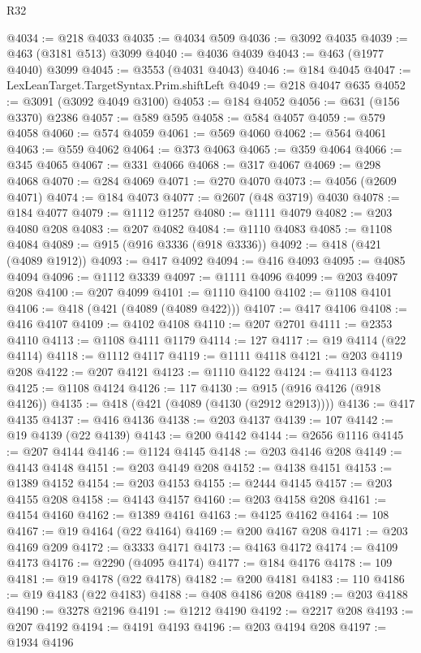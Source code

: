 \begin{lexlean}{R32}
\begin{coremodule}
@4034 := @218 @4033
@4035 := @4034 @509
@4036 := @3092 @4035
@4039 := @463 (@3181 @513) @3099
@4040 := @4036 @4039
@4043 := @463 (@1977 @4040) @3099
@4045 := @3553 (@4031 @4043)
@4046 := @184 @4045
@4047 := LexLeanTarget.TargetSyntax.Prim.shiftLeft
@4049 := @218 @4047 @635
@4052 := @3091 (@3092 @4049 @3100)
@4053 := @184 @4052
@4056 := @631 (@156 @3370) @2386
@4057 := @589 @595
@4058 := @584 @4057
@4059 := @579 @4058
@4060 := @574 @4059
@4061 := @569 @4060
@4062 := @564 @4061
@4063 := @559 @4062
@4064 := @373 @4063
@4065 := @359 @4064
@4066 := @345 @4065
@4067 := @331 @4066
@4068 := @317 @4067
@4069 := @298 @4068
@4070 := @284 @4069
@4071 := @270 @4070
@4073 := @4056 (@2609 @4071)
@4074 := @184 @4073
@4077 := @2607 (@48 @3719) @4030
@4078 := @184 @4077
@4079 := @1112 @1257
@4080 := @1111 @4079
@4082 := @203 @4080 @208
@4083 := @207 @4082
@4084 := @1110 @4083
@4085 := @1108 @4084
@4089 := @915 (@916 @3336 (@918 @3336))
@4092 := @418 (@421 (@4089 @1912))
@4093 := @417 @4092
@4094 := @416 @4093
@4095 := @4085 @4094
@4096 := @1112 @3339
@4097 := @1111 @4096
@4099 := @203 @4097 @208
@4100 := @207 @4099
@4101 := @1110 @4100
@4102 := @1108 @4101
@4106 := @418 (@421 (@4089 (@4089 @422)))
@4107 := @417 @4106
@4108 := @416 @4107
@4109 := @4102 @4108
@4110 := @207 @2701
@4111 := @2353 @4110
@4113 := @1108 @4111 @1179
@4114 := 127
@4117 := @19 @4114 (@22 @4114)
@4118 := @1112 @4117
@4119 := @1111 @4118
@4121 := @203 @4119 @208
@4122 := @207 @4121
@4123 := @1110 @4122
@4124 := @4113 @4123
@4125 := @1108 @4124
@4126 := 117
@4130 := @915 (@916 @4126 (@918 @4126))
@4135 := @418 (@421 (@4089 (@4130 (@2912 @2913))))
@4136 := @417 @4135
@4137 := @416 @4136
@4138 := @203 @4137
@4139 := 107
@4142 := @19 @4139 (@22 @4139)
@4143 := @200 @4142
@4144 := @2656 @1116
@4145 := @207 @4144
@4146 := @1124 @4145
@4148 := @203 @4146 @208
@4149 := @4143 @4148
@4151 := @203 @4149 @208
@4152 := @4138 @4151
@4153 := @1389 @4152
@4154 := @203 @4153
@4155 := @2444 @4145
@4157 := @203 @4155 @208
@4158 := @4143 @4157
@4160 := @203 @4158 @208
@4161 := @4154 @4160
@4162 := @1389 @4161
@4163 := @4125 @4162
@4164 := 108
@4167 := @19 @4164 (@22 @4164)
@4169 := @200 @4167 @208
@4171 := @203 @4169 @209
@4172 := @3333 @4171
@4173 := @4163 @4172
@4174 := @4109 @4173
@4176 := @2290 (@4095 @4174)
@4177 := @184 @4176
@4178 := 109
@4181 := @19 @4178 (@22 @4178)
@4182 := @200 @4181
@4183 := 110
@4186 := @19 @4183 (@22 @4183)
@4188 := @408 @4186 @208
@4189 := @203 @4188
@4190 := @3278 @2196
@4191 := @1212 @4190
@4192 := @2217 @208
@4193 := @207 @4192
@4194 := @4191 @4193
@4196 := @203 @4194 @208
@4197 := @1934 @4196

\end{coremodule}
\end{lexlean}
